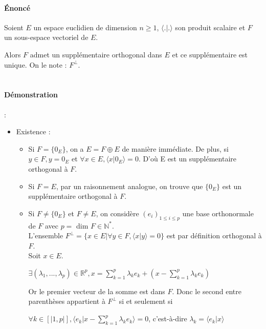 \documentclass{article}
\begin{document}
\paragraph{\uppercase{é}noncé}
Soient $E$ un espace euclidien de dimension $n \geq 1$, $\langle .| .\rangle$ son produit scalaire et $F$ un sous-espace vectoriel de $E$.

Alors $F$ admet un supplémentaire orthogonal dans $E$ et ce supplémentaire est unique. On le note : $F^{\perp}$.
 \\
 \\
\paragraph{Démonstration} :

\begin{itemize}

\item Existence :

\begin{itemize}


\item Si $F = \{0_E\}$, on a $E = F \oplus E$ de manière immédiate. De plus, si $y \in F, y = 0_E$ et $\forall x \in E, \langle x|0_E \rangle = 0 $. D'où E est un supplémentaire orthogonal à $F$. \\

\item Si $F = E$, par un raisonnement analogue, on trouve que $\{0_E\}$ est un supplémentaire orthogonal à $F$. \\

\item Si $F \neq \{0_E\}$ et $F \neq E$, on considère $(e_i)_{1\leq{}i\leq{}p}$ une base orthonormale de $F$ avec $p =$ dim $F \in \mathbb{N}^{*}.$ \\

L'ensemble $F^{\perp} = \{ x \in E | \forall y \in F, \langle x|y \rangle = 0 \}$ est par définition orthogonal à $F$. \\

Soit $x \in E$.

$\exists (\lambda{}_{1}, ..., \lambda{}_{p}) \in \mathbb{R}^p , x = \sum_{k = 1}^{p} \lambda{}_{k}e_k + (x - \sum_{k = 1}^{p} \lambda{}_{k}e_k)$

Or le premier vecteur de la somme est dans $F$. Donc le second entre parenthèses appartient à $F^{\perp}$ si et seulement si 

$\displaystyle \forall k \in [|1,p|], \langle e_k | x - \sum_{k = 1}^{p}\lambda{}_{k}e_k \rangle = 0$, c'est-à-dire $\lambda_{k} = \langle e_k | x \rangle$


\end{itemize}
\end{itemize}
\end{document}
